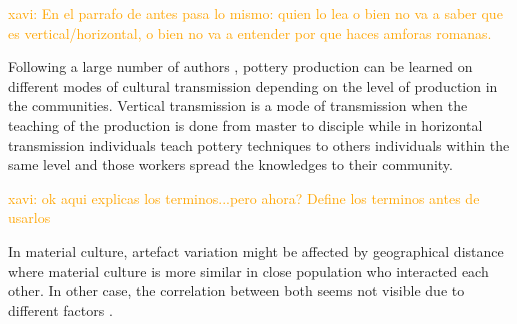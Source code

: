 \documentclass[review]{elsarticle}
\newcommand{\memo}[2]{\textcolor{#1}{#2}}
\newcommand{\xavi}[1]{\memo{orange}{xavi: #1\\}}
\begin{document}
\xavi{En el parrafo de antes pasa lo mismo: quien lo lea o bien no va a saber que es vertical/horizontal, o bien no va a entender por que haces amforas romanas.}

Following a large number of authors \citep{cavalli-sforza_cultural_1981, hosfield_modes_2009}, pottery production can be learned on different modes of cultural transmission depending on the level of production in the communities. Vertical transmission is a mode of transmission when the teaching of the production is done from master to disciple  while in horizontal transmission individuals teach pottery techniques to others individuals within the same level and those workers spread the knowledges to their community. 

\xavi{ok aqui explicas los terminos...pero ahora? Define los terminos antes de usarlos}


 
In material culture, artefact variation might be affected by geographical distance \citep{bjorklund_effect_2010,shennan_isolation-by-distance_2015, van_strien_isolation-by-distance_2015} where material culture is more similar in close population who interacted each other. In other case, the correlation between both seems not visible due to different factors \citep{hart_effects_2012}. 



\end{document}
